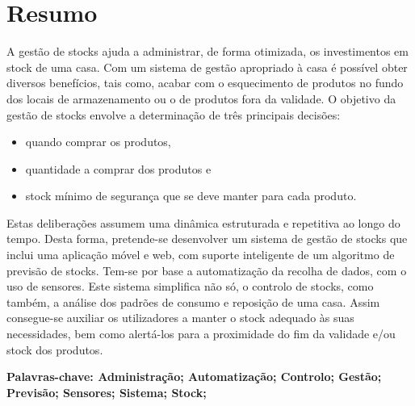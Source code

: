 \cleardoublepage\newpage
\chapter*{Resumo} \label{resumo}
A gestão de stocks ajuda a administrar, de forma otimizada, os investimentos em stock de uma casa. Com um sistema de gestão apropriado à casa é possível obter diversos benefícios, tais como, acabar com o esquecimento de produtos no fundo dos locais de armazenamento ou o de produtos fora da validade.
O objetivo da gestão de stocks envolve a determinação de três principais decisões:
\begin{itemize}
	\item quando comprar os produtos,
	\item quantidade a comprar dos produtos e
	\item stock mínimo de segurança que se deve manter para cada produto.
\end{itemize}
Estas deliberações assumem uma dinâmica estruturada e repetitiva ao longo do tempo.
Desta forma, pretende-se desenvolver um sistema de gestão de stocks que inclui uma aplicação móvel e web, com suporte inteligente de um algoritmo de previsão de stocks. Tem-se por base a automatização da recolha de dados, com o uso de sensores. Este sistema simplifica não só, o controlo de stocks, como também, a análise dos padrões de consumo e reposição de uma casa. Assim consegue-se auxiliar os utilizadores a manter o stock adequado às suas necessidades, bem como alertá-los para a proximidade do fim da validade e/ou stock dos produtos.

\vspace{0.2cm}
{\bf Palavras-chave: Administração; Automatização; Controlo; Gestão; Previsão; Sensores; Sistema; Stock;} 